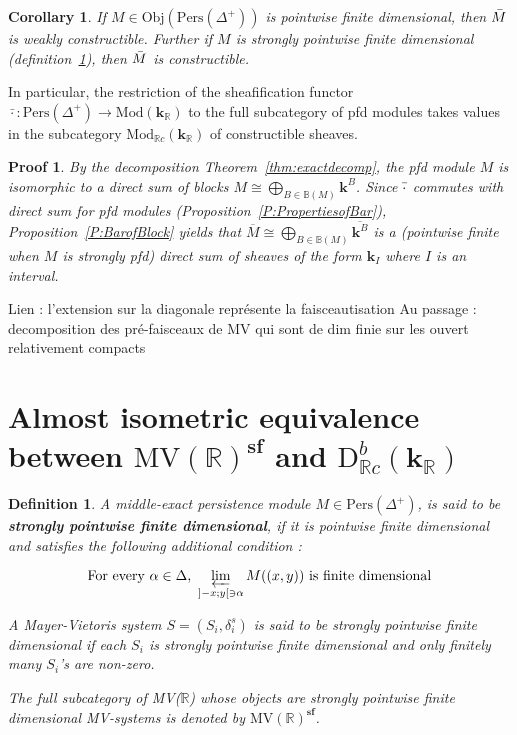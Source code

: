\documentclass[a4paper, english, 11pt]{article}
\newcommand{\kk}[0]{\textbf{k}}
\newcommand{\Mod}[0]{\text{Mod}}
\newcommand{\Pe}{\text{Pers}}
\newcommand{\0}{\vec{0}}
\newcommand{\R}[0]{\mathbb{R}}
\newcommand{\D}[0]{\text{D}}
\newcommand{\Obj}[0]{\text{Obj}}
\newcommand{\Pers}[0]{\text{Pers}}
\newcommand{\s}{\textbf{sf}}
\newtheorem*{pf}{Proof} }
\newtheorem{cor}[prop]{Corollary}
\newtheorem{defi}[prop]{Definition}
\begin{document}
\begin{cor}\label{C:pfdimpliesconstructible}
 If $M \in \Obj(\Pe(\Delta^{+}))$ is pointwise finite dimensional, then $\Bar{M}$ is weakly constructible. 
 Further if $M$ is strongly pointwise finite dimensional (definition~\ref{D:spfd}), then $\Bar{M}$ is constructible. 
\end{cor}
In particular, the restriction of the sheafification functor $\bar{\cdot}:\Pe(\Delta^{+})\to \Mod(\kk_\R)$ to the full subcategory of pfd modules takes values in the subcategory $ \Mod_{\R c}(\kk_\R)$ of constructible sheaves.
\begin{pf}
 By the decomposition Theorem~\ref{thm:exactdecomp}, the pfd module $M$ is isomorphic to a direct sum of blocks $M\cong  \bigoplus_{B\in \mathbb{B}(M)} \kk^B$. Since $\Bar{\cdot}$ commutes with direct sum for pfd modules (Proposition~\ref{P:PropertiesofBar}), Proposition~\ref{P:BarofBlock} yields that $\overline{M} \cong \bigoplus_{B\in \mathbb{B}(M)} \overline{\kk^B} $ is a (pointwise finite when $M$ is strongly pfd) direct sum of sheaves of the form $\kk_{I}$ where $I$ is an interval. 
\end{pf}



Lien : l'extension sur la diagonale représente la faisceautisation
Au passage : decomposition des pré-faisceaux de MV qui sont de dim finie sur les ouvert relativement compacts




\section{ Almost isometric equivalence between $\mbox{MV}(\R)^\s$ and $\D^b_{\R c}(\kk_\R)$}


\begin{defi}\label{D:spfd}
 A middle-exact persistence module $M\in \Pers(\Delta^+)$, is said to be \textbf{strongly pointwise finite dimensional}, if it is pointwise finite dimensional and satisfies the following additional condition : 

$$\text{For every $\alpha \in \Delta$,}~ \varprojlim_{]-x;y[\ni \alpha}M((x,y))  ~ \text{is finite dimensional} $$

A  Mayer-Vietoris system $S=(S_i,\delta^s_i)$ is said to be strongly pointwise finite dimensional if each $S_i$ is strongly pointwise finite dimensional  and only finitely many  $S_i$'s are non-zero.

The full subcategory of MV($\R$) whose objects are strongly pointwise finite dimensional MV-systems is denoted by $\text{MV}(\R)^\s$.
\end{defi}
\end{document}
